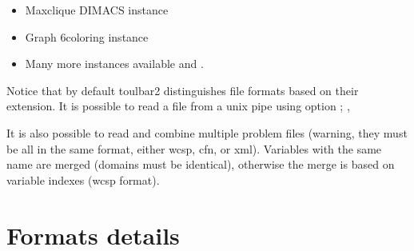 \documentclass[letterpaper,10pt,openany,oneside,english]{sphinxmanual}
\begin{document}
\begin{itemize}
\item {} 
\sphinxAtStartPar
Max\sphinxhyphen{}clique DIMACS instance 

\item {} 
\sphinxAtStartPar
Graph 6\sphinxhyphen{}coloring instance 

\item {} 
\sphinxAtStartPar
Many more instances available  and  .

\end{itemize}

\sphinxAtStartPar
Notice that by default toulbar2 distinguishes file formats based on their extension.
It is possible to read a file from a unix pipe using option ; , 

\sphinxAtStartPar
It is also possible to read and combine multiple problem files (warning, they must be all in the same format, either wcsp, cfn, or xml).
Variables with the same name are merged (domains must be identical), otherwise the merge is based on variable indexes (wcsp format).


\section{Formats details}
\label{\detokenize{userdoc:formats-details}}
\sphinxstepscope
\end{document}
